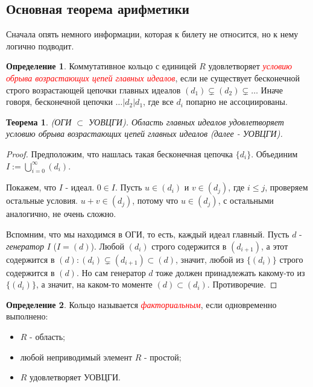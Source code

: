 \documentclass[a4paper,100pt]{article}
\theoremstyle{indented}
\newtheorem{theorem}{Теорема}
\theoremstyle{definition}
\newtheorem{defn}{Определение}
\theoremstyle{remark}
\begin{document}
\resetall

\subsection{Основная теорема арифметики}

Сначала опять немного информации, которая к билету не относится, но к нему логично подводит.\

\begin{defn}
    Коммутативное кольцо с единицей $R$ удовлетворяет \hypertarget{n11}{\textcolor{red}{\textit{условию обрыва возрастающих цепей главных идеалов}}}, если не существует бесконечной строго возрастающей цепочки главных идеалов $(d_1)\subsetneq (d_2)\subsetneq \dots$ Иначе говоря, бесконечной цепочки $\dots \vert d_2\vert d_1$, где все $d_i$ попарно не ассоциированы.
\end{defn}

\begin{theorem}
    (ОГИ $\subset$ УОВЦГИ). Область главных идеалов удовлетворяет условию обрыва возрастающих цепей главных идеалов (далее - УОВЦГИ).
\end{theorem}

\begin{proof}
    Предположим, что нашлась такая бесконечная цепочка $\{d_i\}$. Объединим $I:=\bigcup_{i=0}^\infty (d_i)$.\

    Покажем, что $I$ - идеал. $0\in I$. Пусть $u\in (d_i)$ и $v\in (d_j)$, где $i\leq j$, проверяем остальные условия. $u+v\in(d_j)$, потому что $u\in (d_j)$, с остальными аналогично, не очень сложно.\ 

    Вспомним, что мы находимся в ОГИ, то есть, каждый идеал главный. Пусть $d$ - \textit{генератор} $I$ ($I=(d)$). Любой $(d_i)$ строго содержится в $(d_{i+1})$, а этот содержится в $(d):(d_i)\subsetneq (d_{i+1})\subset (d)$, значит, любой из $\{(d_i)\}$ строго содержится в $(d)$. Но сам генератор $d$ тоже должен принадлежать какому-то из $\{(d_i)\}$, а значит, на каком-то моменте $(d)\subset (d_i)$. Противоречие.
\end{proof}

\begin{defn}
    Кольцо называется \hypertarget{n12}{\textcolor{red}{\textit{факториальным}}}, если одновременно выполнено:
    \begin{itemize}
        \item $R$ - область;
        \item любой неприводимый элемент $R$ - простой;
        \item $R$ удовлетворяет УОВЦГИ.
    \end{itemize}
\end{defn}
\end{document}
